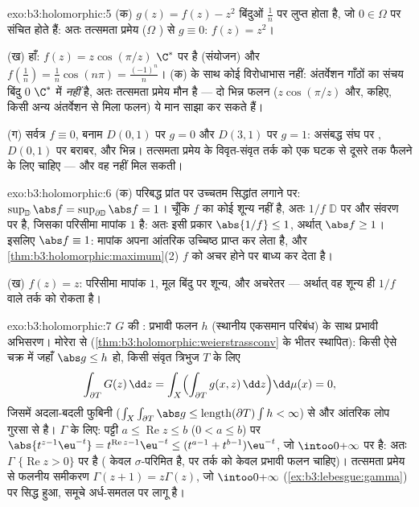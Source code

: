 \begin{solution}{exo:b3:holomorphic:5}
(क) $g(z) = f(z) - z^2$ बिंदुओं $\frac1n$ पर लुप्त होता है, जो $0 \in \Omega$ पर संचित होते हैं:
अतः तत्समता प्रमेय ($\Omega$ ) से $g \equiv 0$: $f(z) = z^2$।

(ख) हाँ: $f(z) = z\cos(\pi/z)$ $\C^*$ पर  है (संयोजन) और $f(\frac1n) = \frac1n\cos(n\pi) =
\frac{(-1)^n}n$। (क) के
साथ कोई विरोधाभास नहीं: अंतर्वेशन गाँठों का संचय बिंदु $0$ $\C^*$
में \emph{नहीं} है, अतः तत्समता प्रमेय मौन है --- दो भिन्न फलन ($z\cos(\pi/z)$
और, कहिए, किसी अन्य अंतर्वेशन से मिला फलन) ये मान साझा कर सकते हैं।

(ग) सर्वत्र $f \equiv 0$, बनाम $D(0,1)$ पर $g = 0$ और $D(3,1)$ पर $g = 1$: असंबद्ध
संघ पर , $D(0,1)$ पर बराबर, और भिन्न। तत्समता प्रमेय के
विवृत-संवृत तर्क को एक घटक से दूसरे तक फैलने के लिए  चाहिए
--- और वह नहीं मिल सकती।
\end{solution}

\begin{solution}{exo:b3:holomorphic:6}
(क) परिबद्ध प्रांत पर उच्चतम सिद्धांत लगाने पर: $\sup_{\mathbb D}\abs f = \sup_{\partial\mathbb D}\abs f = 1$। चूँकि $f$
का कोई शून्य नहीं है, अतः $1/f$ $\mathbb D$ पर  और संवरण पर 
है, जिसका परिसीमा मापांक $1$ है: अतः इसी प्रकार $\abs{1/f} \leq 1$, अर्थात्
$\abs f \geq 1$। इसलिए $\abs f \equiv
1$: मापांक अपना आंतरिक उच्चिष्ठ प्राप्त कर लेता है,
और \cref{thm:b3:holomorphic:maximum}(2) $f$ को अचर होने पर बाध्य कर देता है।

(ख) $f(z) = z$: परिसीमा मापांक $1$, मूल बिंदु पर शून्य, और अचरेतर ---
अर्थात् वह शून्य ही $1/f$ वाले तर्क को रोकता है।
\end{solution}

\begin{solution}{exo:b3:holomorphic:7}
$G$ की : प्रभावी फलन $h$ (स्थानीय एकसमान परिबंध) के साथ
प्रभावी अभिसरण।  मोरेरा से (\cref{thm:b3:holomorphic:weierstrassconv} के भीतर स्थापित):
किसी ऐसे चक्र में जहाँ $\abs g \leq h$ हो, किसी संवृत त्रिभुज $T$ के लिए
\[
\int_{\partial T}G(z)\,\dd z =
\int_X\Bigl(\int_{\partial T}g(x, z)\,\dd z\Bigr)\dd\mu(x) =
0,
\]
जिसमें अदला-बदली फुबिनी ($\int_X\int_{\partial T}\abs
g \leq \operatorname{length}(\partial T)\int h < \infty$) से और आंतरिक लोप गुरसा से है। $\Gamma$
के लिए: पट्टी $a
\leq \operatorname{Re}z \leq b$ ($0 < a \leq b$) पर $\abs{t^{z-1}\eu^{-t}} = t^{\operatorname{Re}z-1}\eu^{-t} \leq
(t^{a-1} + t^{b-1})\eu^{-t}$, जो $\intoo0{+\infty}$ पर  है: अतः
$\Gamma$ $\{\operatorname{Re} z > 0\}$ पर  है ( केवल $\sigma$-परिमित है, पर तर्क को
केवल  प्रभावी फलन चाहिए)। तत्समता प्रमेय से फलनीय समीकरण
$\Gamma(z + 1) = z\Gamma(z)$, जो $\intoo0{+\infty}$ (\cref{ex:b3:lebesgue:gamma}) पर सिद्ध हुआ, समूचे अर्ध-समतल पर लागू है।
\end{solution}

